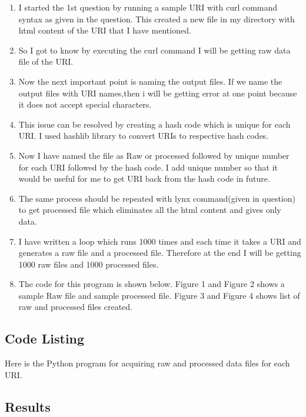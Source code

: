 \begin{enumerate}
\item I started the 1st question by running a sample URI with curl command syntax as given in the question.  This created a new file in my directory with html content of the URI that I have mentioned.
\item So I got to know by executing the curl command I will be getting raw data file of the URI.
\item Now the next important point is naming the output files. If we name the output files with URI names,then i will be getting error at one point because it does not accept special characters.
\item This issue can be resolved by creating a hash code which is unique for each URI. I used hashlib library to convert URIs to respective hash codes. 
\item Now I have named the file as Raw or processed followed by unique number for each URI followed by the hash code. I add unique number so that it would be useful for me to get URI back from the hash code in future.
\item The same process should be repeated with lynx command(given in question) to get processed file which eliminates all the html content and gives only data.
\item I have written a loop which runs 1000 times and each time it takes a URI and generates a raw file and a processed file. Therefore at the end I will be getting 1000 raw files and 1000 processed files.
\item The code for this program is shown below. Figure 1 and Figure 2 shows a sample Raw file and sample processed file. Figure 3 and Figure 4 shows list of raw and processed files created. 
\end{enumerate}
\newpage
\subsection{Code Listing}
Here is the Python program for acquiring raw and processed data files for each URI. 



\newpage
\subsection{Results}


